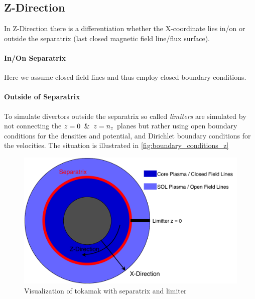 \documentclass[master.tex]{subfiles}
\begin{document}
\subsection{Z-Direction}
In Z-Direction there is a differentiation whether the X-coordinate lies in/on or outside the separatrix (last closed magnetic field line/flux surface).
\paragraph{In/On Separatrix}
Here we assume closed field lines and thus employ closed boundary conditions.
\paragraph{Outside of Separatrix}
To simulate  divertors outside the separatrix so called \textit{limiters} are simulated by not connecting the $z=0 \And z=n_z$ planes but rather using open boundary conditions for the densities and potential, and Dirichlet boundary conditions for the velocities. The situation is illustrated in \autoref{fig:boundary_conditions_z}
\begin{figure}[ht]
    \centering
    \includegraphics[width=\linewidth]{pdfs/boundary_conditions_z.pdf}
    \caption{Visualization of tokamak with separatrix and limiter}
    \label{fig:boundary_conditions_z}
\end{figure}
\end{document}
